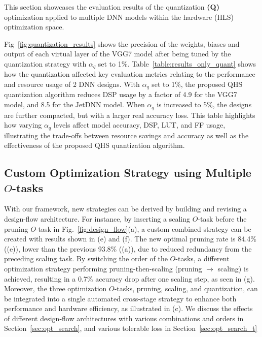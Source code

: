 This section showcases the evaluation results of the quantization \textbf{(Q)} optimization applied to multiple DNN models within the hardware (HLS) optimization space.

Fig~\ref{fig:quantization_results} shows the precision of the weights, biases and output of each virtual layer of the VGG7 model after being tuned by the quantization strategy with $\alpha_q$ set to 1\%. 
Table~\ref{table:results_only_quant} shows how the quantization affected key evaluation metrics relating to the performance and resource usage of 2 DNN designs. 
With $\alpha_q$ set to 1\%, the proposed QHS quantization algorithm reduces DSP usage by a factor of 4.9 for the VGG7 model, and 8.5 for the JetDNN model. When $\alpha_q$ is increased to 5\%, the designs are further compacted, but with a larger real accuracy loss. This table highlights how varying $\alpha_q$ levels affect model accuracy, DSP, LUT, and FF usage, illustrating the trade-offs between resource savings and accuracy as well as the effectiveness of the proposed QHS quantization algorithm. 



\subsection{Custom Optimization Strategy using Multiple $O$-tasks}\label{sec:multi_opt}


With our framework, new strategies can be derived by building and revising a design-flow architecture. For instance, by inserting a scaling $O$-task before the pruning $O$-task in Fig.~\ref{fig:design_flow}(a), a custom combined strategy can be created with results shown in (e) and (f). The new optimal pruning rate is 84.4\% ((e)), lower than the previous 93.8\% ((a)), due to reduced redundancy from the preceding scaling task. By switching the order of the $O$-tasks, a different optimization strategy performing pruning-then-scaling (pruning $\rightarrow$ scaling) is achieved, resulting in a 0.7\% accuracy drop after one scaling step, as seen in (g). Moreover, the three optimization $O$-tasks, pruning, scaling, and quantization, can be integrated into a single automated cross-stage strategy to enhance both performance and hardware efficiency, as illustrated in (c). We discuss the effects of different design-flow architectures with various combinations and orders in Section~\ref{sec:opt_search}, and various tolerable loss in Section~\ref{sec:opt_search_t}

